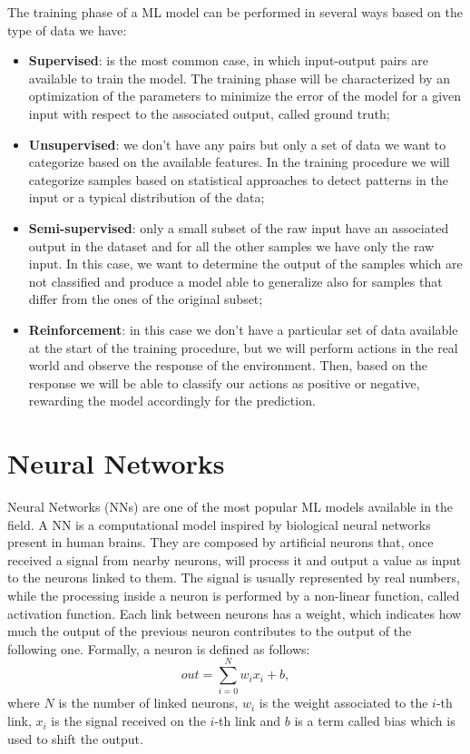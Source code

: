 \documentclass[binding=0.6cm,noexaminfo]{sapthesis}
\begin{document}
The training phase of a ML model can be performed in several ways based on the type of data we have:
\begin{itemize}
\item \textbf{Supervised}: is the most common case, in which input-output pairs are available to train the model. The training phase will be characterized by an optimization of the parameters to minimize the error of the model for a given input with respect to the associated output, called ground truth;
\item \textbf{Unsupervised}: we don't have any pairs but only a set of data we want to categorize based on the available features. In the training procedure we will categorize samples based on statistical approaches to detect patterns in the input or a typical distribution of the data;
\item \textbf{Semi-supervised}: only a small subset of the raw input have an associated output in the dataset and for all the other samples we have only the raw input. In this case, we want to determine the output of the samples which are not classified and produce a model able to generalize also for samples that differ from the ones of the original subset;
\item \textbf{Reinforcement}: in this case we don't have a particular set of data available at the start of the training procedure, but we will perform actions in the real world and observe the response of the environment. Then, based on the response we will be able to classify our actions as positive or negative, rewarding the model accordingly for the prediction.
\end{itemize}

\section{Neural Networks}\label{sec:nn}
Neural Networks (NNs) are one of the most popular ML models available in the field. A NN is a computational model inspired by biological neural networks present in human brains. They are composed by artificial neurons that, once received a signal from nearby neurons, will process it and output a value as input to the neurons linked to them. The signal is usually represented by real numbers, while the processing inside a neuron is performed by a non-linear function, called activation function.
Each link between neurons has a weight, which indicates how much the output of the previous neuron contributes to the output of the following one. Formally, a neuron is defined as follows:
\begin{equation}
out = \sum_{i=0}^N w_i x_i + b,
\end{equation}
where $N$ is the number of linked neurons, $w_i$ is the weight associated to the $i$-th link, $x_i$ is the signal received on the $i$-th link and $b$ is a term called bias which is used to shift the output.
\end{document}
